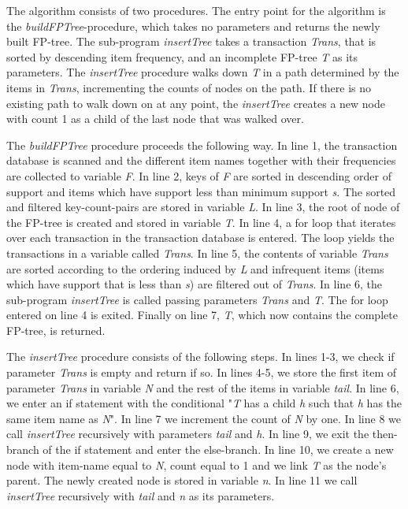 The algorithm consists of two procedures. The entry point for the algorithm is the \textit{buildFPTree}-procedure, which takes no parameters and returns the newly built FP-tree. The sub-program \textit{insertTree} takes a transaction \textit{Trans}, that is sorted by descending item frequency, and an incomplete FP-tree \textit{T} as its parameters. The \textit{insertTree} procedure walks down \textit{T} in a path determined by the items in \textit{Trans}, incrementing the counts of nodes on the path. If there is no existing path to walk down on at any point, the \textit{insertTree} creates a new node with count 1 as a child of the last node that was walked over.

The \textit{buildFPTree} procedure proceeds the following way. In line 1, the transaction database is scanned and the different item names together with their frequencies are collected to variable \textit{F}. In line 2, keys of \textit{F} are sorted in descending order of support and items which have support less than minimum support \textit{s}. The sorted and filtered key-count-pairs are stored in variable \textit{L}. In line 3, the root of node of the FP-tree is created and stored in variable \textit{T}. In line 4, a for loop that iterates over each transaction in the transaction database is entered. The loop yields the transactions in a variable called \textit{Trans}. In line 5, the contents of variable \textit{Trans} are sorted according to the ordering induced by \textit{L} and infrequent items (items which have support that is less than \textit{s}) are filtered out of \textit{Trans}. In line 6, the sub-program \textit{insertTree} is called passing parameters \textit{Trans} and \textit{T}. The for loop entered on line 4 is exited. Finally on line 7, \textit{T}, which now contains the complete FP-tree, is returned.  

The \textit{insertTree} procedure consists of the following steps. In lines 1-3, we check if parameter \textit{Trans} is empty and return if so. In lines 4-5, we store the first item of parameter \textit{Trans} in variable \textit{N} and the rest of the items in variable \textit{tail}. In line 6, we enter an if statement with the conditional "\textit{T} has a child \textit{h} such that \textit{h} has the same item name as \textit{N}". In line 7 we increment the count of \textit{N} by one. In line 8 we call \textit{insertTree} recursively with parameters \textit{tail} and \textit{h}. In line 9, we exit the then-branch of the if statement and enter the else-branch. In line 10, we create a new node with item-name equal to \textit{N}, count equal to 1 and we link \textit{T} as the node's parent. The newly created node is stored in variable \textit{n}. In line 11 we call \textit{insertTree} recursively with \textit{tail} and \textit{n} as its parameters.

